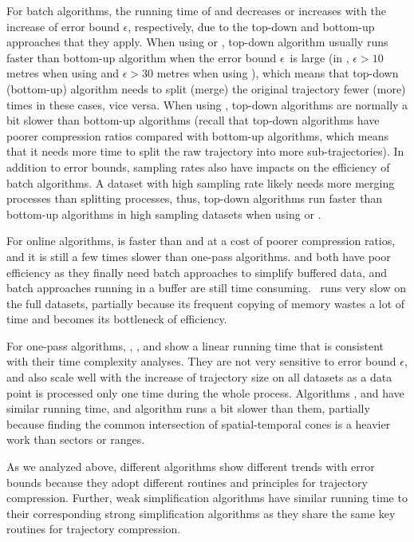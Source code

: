 {For batch algorithms, the running time of \dpa and \tpa decreases or increases with the increase of error bound $\epsilon$, respectively, due to the top-down and bottom-up approaches that they apply. When using \ped or \sed, top-down algorithm usually runs faster than bottom-up algorithm when the error bound $\epsilon$~is large (\eg in \geolife, $\epsilon >10$ metres when using \ped and $\epsilon >30$ metres when using \sed), which means that top-down (bottom-up) algorithm needs to split (merge) the original trajectory fewer (more) times in these cases, vice versa. When using \dad,  top-down algorithms are normally a bit slower than bottom-up algorithms (recall that top-down algorithms have poorer compression ratios compared with bottom-up algorithms, which means that it needs more time to split the raw trajectory into more sub-trajectories).
In addition to error bounds, sampling rates also have impacts on the efficiency of batch algorithms. A dataset with high sampling rate likely needs more merging processes than splitting processes, thus, top-down algorithms run faster than bottom-up algorithms in high sampling datasets when using \ped or \sed.

For online algorithms, \squishe is faster than \bqsa and \opwa at a cost of poorer compression ratios, and it is still a few times slower than one-pass algorithms. \bqsa and \opwa both have poor efficiency as they finally need batch approaches to simplify buffered data, and batch approaches running in a buffer are still time consuming. {\dagots~runs very slow on the full datasets, partially because its frequent copying of memory wastes a lot of time and becomes its bottleneck of efficiency.}

For one-pass algorithms, \operb, \siped, \cised and \interval show a linear running time that is consistent with their time complexity analyses. They are not very sensitive to error bound $\epsilon$, and also scale well with the increase of trajectory size on all datasets as a data point is processed only one time during the whole process.
Algorithms \siped, \operb and \interval have similar running time, and algorithm \cised runs a bit slower than them, partially because finding the common intersection of spatial-temporal cones is a heavier work than sectors or ranges.

{As we analyzed above, different algorithms show different trends with error bounds because they adopt different routines and principles for trajectory compression.}
{Further, weak simplification algorithms have similar running time to their corresponding strong simplification algorithms as they share the same key routines for trajectory compression.}



}
